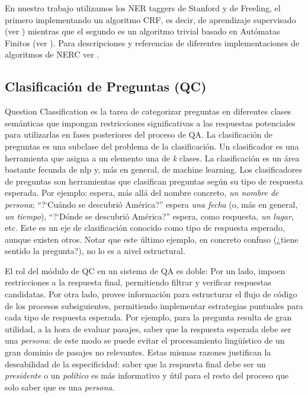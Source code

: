 En nuestro trabajo utilizamos los NER taggers de Stanford\cite{NER2} y de Freeling, el primero implementando un algoritmo CRF, es decir, de aprendizaje supervisado (ver ) mientras que el segundo es un algoritmo trivial basado en Autómatas Finitos (ver ). Para descripciones y referencias de diferentes implementaciones de algoritmos de NERC ver \cite{NER1}.


\subsection{Clasificación de Preguntas (QC)}
\label{subsec:qc}
Question Classification es la tarea de categorizar preguntas en diferentes 
clases semánticas que impongan restricciones significativas a las respuestas potenciales 
para utilizarlas en fases posteriores del proceso de QA.
La clasificación de preguntas es una subclase del problema de la clasificación. 
Un clasificador es una herramienta que asigna a un elemento una de
\textit{k} clases. La clasificación es un área bastante fecunda de nlp y, más en general, de machine learning. 
Los clasificadores de preguntas son herramientas que clasifican preguntas según su tipo de respuesta esperada. Por ejemplo:
 espera, más allá del nombre concreto, \textit{un nombre de persona}; {\textquotedblleft}?`Cuándo se descubrió
América?{\textquotedblright} espera \textit{una fecha} (o, más en
general, \textit{un tiempo}), {\textquotedblleft}?`Dónde se
descubrió América?{\textquotedblright} espera, como respuesta,
\textit{un lugar}, etc. Este es un eje de clasificación conocido como
tipo de respuesta esperado, aunque existen otros. Notar que este último ejemplo, en concreto confuso (¿tiene sentido la pregunta?), no lo es a nivel estructural.

El rol del módulo de QC en un sistema de QA es doble: Por un lado, impoen restricciones a la respuesta final, permitiendo filtrar y verificar respuestas candidatas.
Por otra lado, provee información para estructurar el flujo de código de los procesos subsiguientes, permitiendo implementar estrategias puntuales para cada tipo de respuesta esperada. Por ejemplo, para la pregunta  resulta de gran utilidad, a la hora de evaluar pasajes, saber que la respuesta esperada debe ser una \textit{persona}: de este modo se puede evitar el procesamiento lingüístico de un gran dominio de pasajes no relevantes. Estas mismas razones justifican la deseabilidad de la especificidad: saber que la respuesta final debe ser un \textit{presidente} o un \textit{político} es más informativo y útil para el resto del proceso que solo saber que es una \textit{persona}.

